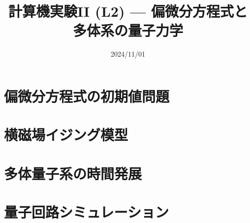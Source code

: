 \documentclass[10pt,dvipdfmx]{beamer}
\title{計算機実験II (L2) --- 偏微分方程式と多体系の量子力学}
\date{2024/11/01}
\begin{document}
\begin{frame}
  \titlepage
  \tableofcontents
\end{frame}

\section{偏微分方程式の初期値問題}
















% 
% 
% 

\section{横磁場イジング模型}





\section{多体量子系の時間発展}





\section{量子回路シミュレーション}







\section{}

\end{document}

